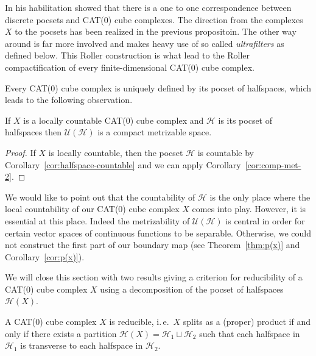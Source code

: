 \begin{rem}
  \label{rem:roller}
  In his habilitation \textcite{Roller1999} showed that there is a one to one correspondence between discrete pocsets and CAT(0) cube complexes. The direction from the complexes \(X\) to the pocsets has been realized in the previous propositoin. The other way around is far more involved and makes heavy use of so called \emph{ultrafilters} as defined below. This Roller construction is what lead to the Roller compactification of every finite-dimensional CAT(0) cube complex.

  Every CAT(0) cube complex is uniquely defined by its pocset of halfspaces, which leads to the following observation.
\end{rem}

\begin{cor}
  \label{cor:comp-met}
  If \(X\) is a locally countable CAT(0) cube complex and \(\mathcal{H}\) is its pocset of halfspaces then \(\mathcal{U}(\mathcal{H})\) is a compact metrizable space.
\end{cor}

\begin{proof}
  If \(X\) is locally countable, then the pocset \(\mathcal{H}\) is countable by Corollary~\ref{cor:halfspace-countable} and we can apply Corollary~\ref{cor:comp-met-2}.
\end{proof}

\begin{rem}
  We would like to point out that the countability of \(\mathcal{H}\) is the only place where the local countability of our CAT(0) cube complex \(X\) comes into play. However, it is essential at this place. Indeed the metrizability of \(\mathcal{U}(\mathcal{H})\) is central in order for certain vector spaces of continuous functions to be separable. Otherwise, we could not construct the first part of our boundary map (see Theorem~\ref{thm:p(x)} and Corollary~\ref{cor:p(x)}).
\end{rem}

We will close this section with two results giving a criterion for reducibility of a CAT(0) cube complex \(X\) using a decomposition of the pocset of halfspaces \(\mathcal{H}(X)\).

\begin{prop}
  A CAT(0) cube complex \(X\) is reducible, i.\,e.\ \(X\) splits as a (proper) product if and only if  there  exists a partition \(\mathcal{H}(X) = \mathcal{H}_1 \sqcup \mathcal{H}_2\) such that each halfspace in \(\mathcal{H}_1\) is transverse to each halfspace in \(\mathcal{H}_2\).
\end{prop}

